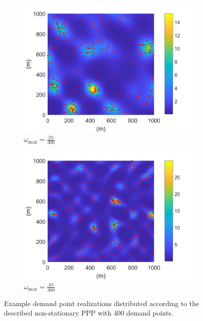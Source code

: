 \documentclass[12pt,dvipsnames]{report}
\begin{document}
\begin{figure}[!ht]
\centering
\begin{subfigure}{.45\textwidth}
	\centering
	\includegraphics[width=1\linewidth]{rho_nsPPP-400_O2pi-300_L50_X1000_Y1000}
	\caption{\small $\omega_{\max}=\frac{2\pi}{300}$}
	\label{fig:rho_nsPPP_2pi-300}
\end{subfigure}
\hspace{0.5cm}
\begin{subfigure}{.45\textwidth}
	\centering
	\includegraphics[width=1\linewidth]{rho_nsPPP-400_O4pi-300_L50_X1000_Y1000}
	\caption{\small $\omega_{\max}=\frac{4\pi}{300}$}
	\label{fig:rho_nsPPP_4pi-300}
\end{subfigure}
\caption[Realizations of example SSLT demand point distributions]{\small Example demand point realizations distributed according to the described non-stationary PPP with 400 demand points.}
\label{fig:rho_nsPPP}
\end{figure}
\end{document}

